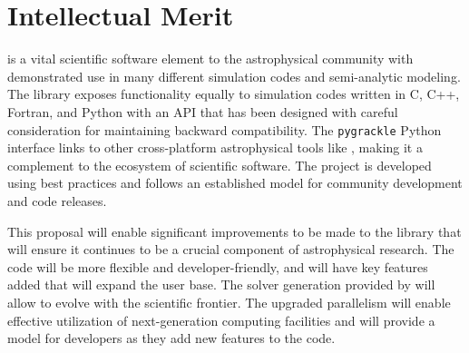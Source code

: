 \section{Intellectual Merit}

\grackle{} is a vital scientific software element to the astrophysical
community with demonstrated use in many different simulation codes and
semi-analytic modeling.  The library exposes functionality equally to
simulation codes written in C, C++, Fortran, and Python with an API
that has been designed with careful consideration for maintaining
backward compatibility.  The \texttt{pygrackle} Python interface links
\grackle{} to other cross-platform astrophysical tools like \yt{},
making it a complement to the ecosystem of scientific software.
The \grackle{} project is developed using
best practices and follows an established model for community
development and code releases.

This proposal will enable significant improvements to be made to the
\grackle{} library that will ensure it continues to be a crucial
component of astrophysical research.  The code will be more flexible
and developer-friendly, and will have key features added that will
expand the user base.  The solver generation provided by \dengo{} will
allow \grackle{} to evolve with the scientific frontier.
The upgraded parallelism will enable
effective utilization of next-generation computing facilities and will
provide a model for developers as they add new features to the code.
